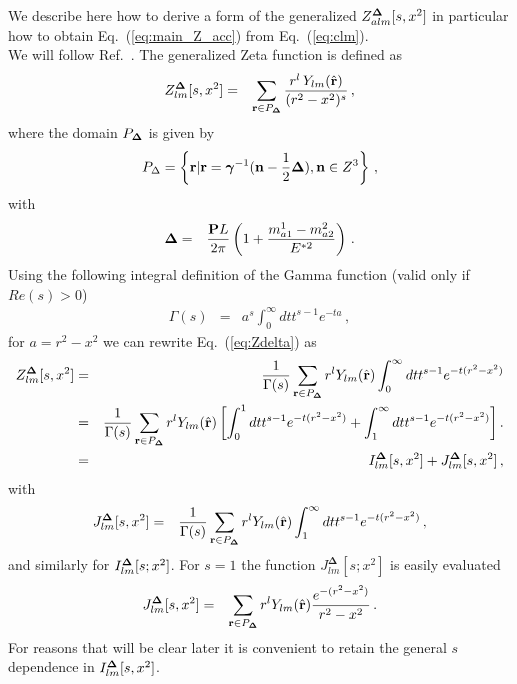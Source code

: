 
	\noindent
	We describe here how to derive a form of the generalized $Z^{\bf\Delta}_{alm}[s,x^2]$ in particular how to obtain Eq.~(\ref{eq:main_Z_acc}) from Eq.~(\ref{eq:clm}).\\
	We will follow Ref.~\cite{Leskovec:2012gb}.
	The generalized Zeta function is defined as
	\begin{eqnarray}
	Z^{\bf\Delta}_{lm}[s,x^2]&=&\sum_{{\bf r}\in P_{\bf \Delta}}\frac{r^l\,Y_{lm}(\hat {\bf r})}{(r^2-x^2)^s}\, ,\label{eq:Zdelta}
	\end{eqnarray}
	where the domain $P_{\bf \Delta}$ is given by
	\begin{eqnarray}
	P_{\Delta}= \left\{{\bf r}|{\bf r}={\bm \gamma}^{-1}({\bf n}-\frac{1}{2}{\bf \Delta}),{\bf n}\in Z^{3}\right\}\, \label{eq:Pd},
	\end{eqnarray}
	with
	\begin{eqnarray}
	{\bf \Delta}&=&\frac{{\bf P}L}{2\pi}\left(1+\frac{m_{a1}^1-m_{a2}^2}{E^{*2}}\right)\, .
	\end{eqnarray}
	Using the following integral definition of the Gamma function (valid only if $Re(s)>0$)
	\begin{eqnarray}
	\Gamma(s)&=&a^s\int_0^\infty dt t^{s-1}e^{-ta}\, ,
	\end{eqnarray}
	for $a=r^2-x^2$ we can rewrite Eq.~(\ref{eq:Zdelta}) as
	\begin{eqnarray}
	Z_{lm}^{\bf \Delta}[s,x^2]&=&\frac{1}{\Gamma(s)}\sum_{{\bf r}\in P_{\bf \Delta}}r^lY_{lm}(\hat{{\bf r}})\int_0^\infty dt t^{s-1}e^{-t(r^2-x^2)}\\
	&=&\frac{1}{\Gamma(s)}\sum_{{\bf r}\in P_{\bf \Delta}}r^lY_{lm}(\hat{{\bf r}})
	\left[\int_0^1 dt t^{s-1}e^{-t(r^2-x^2)}+\int_1^\infty dt t^{s-1}e^{-t(r^2-x^2)}\right]\label{eq:Zexp}.\nonumber\\
	&=&I^{\bf\Delta}_{lm}[s,x^2]+J^{\bf\Delta}_{lm}[s,x^2]\, ,
	\end{eqnarray}
	with
	\begin{eqnarray}
	J^{\bf \Delta}_{lm}[s,x^2]&=&\frac{1}{\Gamma(s)}\sum_{{\bf r}\in P_{\bf \Delta}}r^lY_{lm}(\hat{{\bf r}})\int_1^\infty dt t^{s-1}e^{-t(r^2-x^2)}\, ,
	\end{eqnarray}
	and similarly for $I^{\bf\Delta}_{lm}[s;x^2]$.
	For $s=1$ the function $J^{\bm\Delta}_{lm}[s;x^2]$ is easily evaluated
	\begin{eqnarray}
	J^{\bm\Delta}_{lm}[s,x^2]&=&\sum_{{\bf r}\in P_{\bf \Delta}}r^lY_{lm}(\hat{{\bf r}})\frac{e^{-(r^2-x^2)}}{r^2-x^2}\, .
	\end{eqnarray}
	For reasons that will be clear later it is convenient to retain the general $s$ dependence in $I^{\bf\Delta}_{lm}[s,x^2]$.
